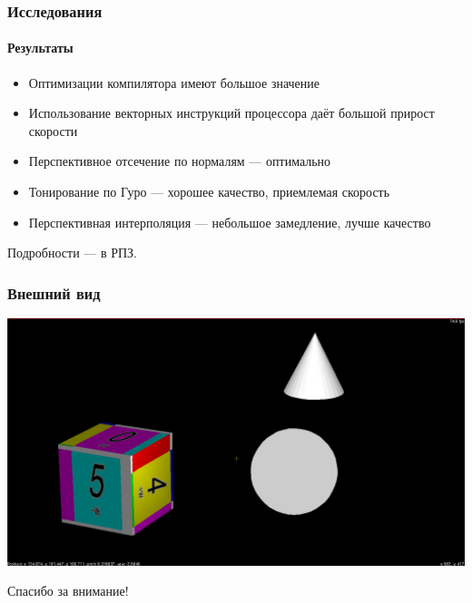 \documentclass{beamer}
\begin{document}
\begin{frame}
\frametitle{Исследования}
\framesubtitle{Результаты}

\begin{itemize}
\item Оптимизации компилятора имеют большое значение
\item Использование векторных инструкций процессора даёт большой прирост скорости
\item Перспективное отсечение по нормалям --- оптимально
\item Тонирование по Гуро --- хорошее качество, приемлемая скорость
\item Перспективная интерполяция --- небольшое замедление, лучше качество
\end{itemize}
Подробности --- в РПЗ.
\end{frame}

\begin{frame}
\frametitle{Внешний вид}

\centering
\includegraphics[width=\textwidth]{window}
\end{frame}

\begin{frame}
\centering
Спасибо за внимание!
\end{frame}
\end{document}
